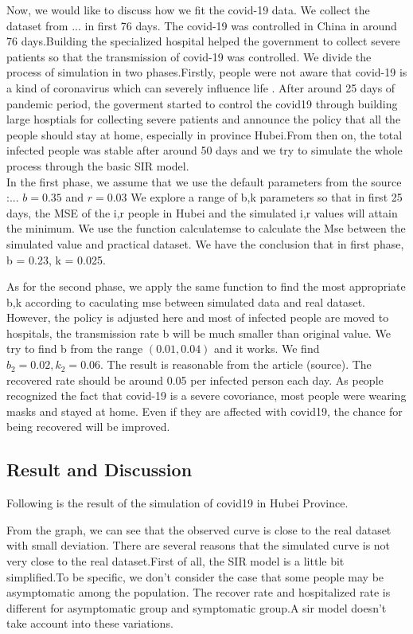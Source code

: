 \documentclass{article}
\begin{document}
Now, we would like to discuss how we fit the covid-19 data. We collect the dataset from ... in first 76 days. The covid-19 was controlled in China in around 76 days.Building the specialized hospital helped the government to collect severe patients so that the transmission of covid-19 was controlled. We divide the process of simulation in two phases.Firstly, people were not aware that covid-19 is a kind of coronavirus which can severely influence life . After around 25 days of pandemic period, the goverment started to control the covid19 through building large hosptials for collecting severe patients and announce the policy that all the people should stay at home, especially in province Hubei.From then on, the total infected people was stable after around 50 days and we try to simulate the whole process through the basic SIR model.\\

In the first phase, we assume that we use the default parameters from the source :... $b = 0.35$  and $r = 0.03$ We explore a range of b,k parameters so that in first 25 days, the MSE of the i,r people in Hubei and the simulated i,r values will attain the minimum. We use the function calculatemse to calculate the Mse between the simulated value and practical dataset. We have the conclusion that in first phase, b = 0.23, k = 0.025.

As for the second phase, we apply the same function to find the most appropriate b,k according to caculating mse between simulated data and real dataset. However, the policy is adjusted here and most of infected people are moved to hospitals, the transmission rate b will be much smaller than original value. We try to find b from the range $(0.01,0.04)$ and it works. We find $b_{2}= 0.02,k_{2} = 0.06$. The result is reasonable from the article (source).
The recovered rate should be around 0.05 per infected person each day. As people recognized the fact that covid-19 is a severe covoriance, most people were wearing masks and stayed at home. Even if they are affected with covid19, the chance for being recovered will be improved.

\subsection{Result and Discussion}
Following is the result of the simulation of covid19 in Hubei Province.

From the graph, we can see that the observed curve is close to the real dataset with small deviation.
There are several reasons that the simulated curve is not very close to the real dataset.First of all, the SIR model is a little bit simplified.To be specific, we don't consider the case that some people may be asymptomatic among the population. The recover rate and hospitalized rate is different for asymptomatic group and symptomatic group.A sir model doesn't take account into these variations.
\end{document}
